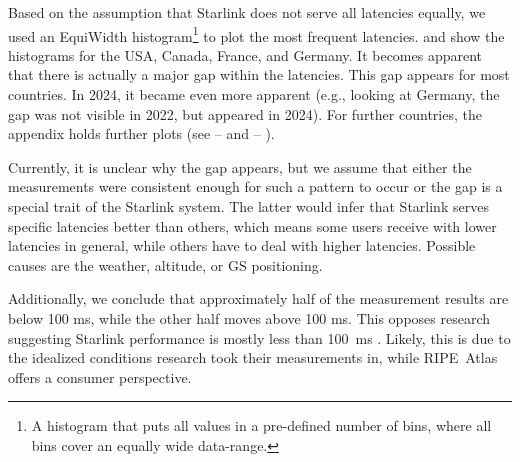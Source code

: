 Based on the assumption that Starlink does not serve all latencies equally, we
used an EquiWidth histogram\footnote{A histogram that puts all values in a
	pre-defined number of bins, where all bins cover an equally wide
	data-range.} to plot the most frequent latencies.
 and  show the
histograms for the USA, Canada, France, and Germany. It becomes apparent that
there is actually a major gap within the latencies. This gap appears for most
countries. In 2024, it became even more apparent (e.g., looking at Germany, the
gap was not visible in 2022, but appeared in 2024). For further countries, the
appendix holds further plots (see  --
 and  --
).

Currently, it is unclear why the gap appears, but we assume that either
the measurements were consistent enough for such a pattern to occur or the gap
is a special trait of the Starlink system. The latter would infer that Starlink
serves specific latencies better than others, which means some users receive
with lower latencies in general, while others have to deal with higher
latencies. Possible causes are the weather, altitude, or \ac{GS} positioning.

Additionally, we conclude that approximately half of the measurement results
are below 100 ms, while the other half moves above 100 ms. This opposes
research suggesting Starlink performance is mostly less than 100~ms
\cite{DBLP:conf/www/MohanFCBRMO24, DBLP:conf/icnp/LaiLL20,
	DBLP:journals/pacmnet/RamanVCSZ23, DBLP:conf/imc/MichelTGB22}. Likely,
this is due to the idealized conditions research took their
measurements in, while RIPE~Atlas offers a consumer perspective.

